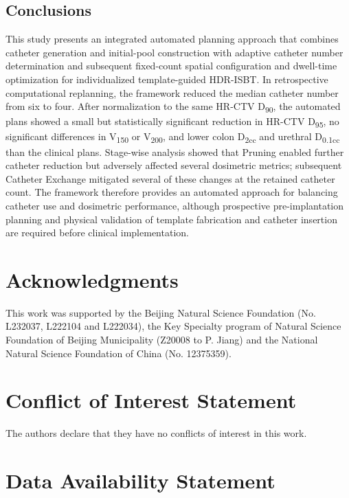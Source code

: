 \documentclass[12pt,twoside,letterpaper]{article}
\begin{document}
\FloatBarrier
\begin{samepage}
\section{Conclusions}\label{sec:5}

This study presents an integrated automated planning approach that combines catheter generation and initial-pool construction with adaptive catheter number determination and subsequent fixed-count spatial configuration and dwell-time optimization for individualized template-guided HDR-ISBT. In retrospective computational replanning, the framework reduced the median catheter number from six to four. After normalization to the same HR-CTV D\textsubscript{90}, the automated plans showed a small but statistically significant reduction in HR-CTV D\textsubscript{95}, no significant differences in V\textsubscript{150} or V\textsubscript{200}, and lower colon D\textsubscript{2cc} and urethral D\textsubscript{0.1cc} than the clinical plans. Stage-wise analysis showed that Pruning enabled further catheter reduction but adversely affected several dosimetric metrics; subsequent Catheter Exchange mitigated several of these changes at the retained catheter count. The framework therefore provides an automated approach for balancing catheter use and dosimetric performance, although prospective pre-implantation planning and physical validation of template fabrication and catheter insertion are required before clinical implementation.

\end{samepage}

\section*{Acknowledgments}

This work was supported by the Beijing Natural Science Foundation (No. L232037, L222104 and L222034), the Key Specialty program of Natural Science Foundation of Beijing Municipality (Z20008 to P. Jiang) and the National Natural Science Foundation of China (No. 12375359).

\section*{Conflict of Interest Statement}

The authors declare that they have no conflicts of interest in this work.

\section*{Data Availability Statement}
\end{document}
